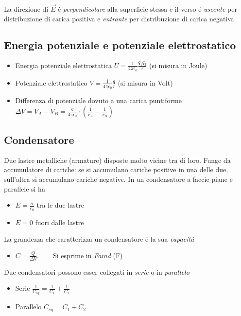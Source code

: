 \documentclass[17pt]{extarticle}
\begin{document}
La direzione di $\vec{E}$ \'e \emph{perpendicolare} alla superficie stessa e il verso \'e \emph{uscente} per distribuzione di carica positiva e \emph{entrante} per distribuzione di carica negativa


\subsection{Energia potenziale e potenziale elettrostatico}



\begin{itemize}
	\item Energia potenziale elettrostatica $U = \frac{1}{4\pi\epsilon_0}\frac{q_1q_2}{r}$ (si misura in Joule)
	\item Potenziale elettrostatico $V = \frac{1}{4\pi\epsilon_0}\frac{q}{r}$ (si misura in Volt)
	\item Differenza di potenziale dovuto a una carica puntiforme $\Delta V = V_A - V_B = \frac{q}{4\pi\epsilon_0}\cdot\left( \frac{1}{r_A} - \frac{1}{r_B} \right)$ 
\end{itemize}


\subsection{Condensatore}

Due lastre metalliche (armature) disposte molto vicine tra di loro. Funge da accumulatore di cariche: se si accumulano cariche positive in una delle due, sull'altra si accumulano cariche negative. In un condensatore a faccie piane e parallele si ha 

\begin{itemize}
	\item $E = \frac{\sigma}{\epsilon_0}$ tra le due lastre
	\item $E = 0$ fuori dalle lastre
\end{itemize}


La grandezza che caratterizza un condensatore \'e la sua \emph{capacit\'a}

\begin{itemize}
	\item $C = \frac{Q}{\Delta V}\qquad$ Si esprime in \emph{Farad} (F)
\end{itemize}


Due condensatori possono esser collegati in \emph{serie} o in \emph{parallelo}

\begin{itemize}
	\item Serie $\frac{1}{C_{eq}} = \frac{1}{C_1} + \frac{1}{C_2}$
	\item Parallelo $C_{eq} = C_1 + C_2$
\end{itemize}
\end{document}
